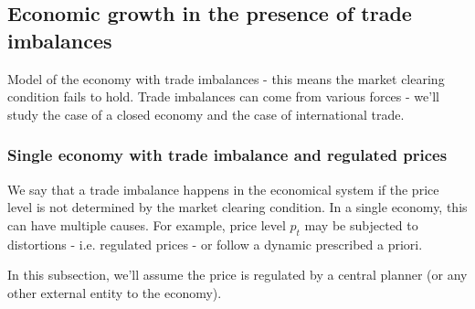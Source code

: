\documentclass{article}
\begin{document}
\subsection{Economic growth in the presence of trade imbalances}

    Model of the economy with trade imbalances - this means the market clearing condition fails to hold.
    Trade imbalances can come from various forces - we'll study the case of a closed economy and
    the case of international trade.

\subsubsection{Single economy with trade imbalance and regulated prices}

    We say that a trade imbalance happens in the economical system if the price level is not determined
    by the market clearing condition. In a single economy, this can have multiple causes. 
    For example, price level $p_t$ may be subjected to distortions - i.e. regulated prices - or
    follow a dynamic prescribed a priori.

    In this subsection, we'll assume the price is regulated by a central planner (or any other 
    external entity to the economy).
\end{document}

